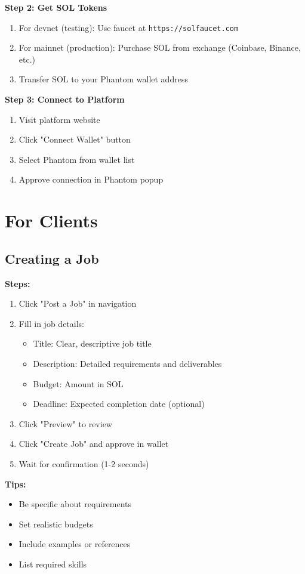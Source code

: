 \documentclass[a4paper,13pt,twoside]{report}
\theoremstyle{definition}
\begin{document}
\textbf{Step 2: Get SOL Tokens}
\begin{enumerate}
    \item For devnet (testing): Use faucet at \texttt{https://solfaucet.com}
    \item For mainnet (production): Purchase SOL from exchange (Coinbase, Binance, etc.)
    \item Transfer SOL to your Phantom wallet address
\end{enumerate}

\textbf{Step 3: Connect to Platform}
\begin{enumerate}
    \item Visit platform website
    \item Click "Connect Wallet" button
    \item Select Phantom from wallet list
    \item Approve connection in Phantom popup
\end{enumerate}

\section{For Clients}

\subsection{Creating a Job}

\textbf{Steps:}
\begin{enumerate}
    \item Click "Post a Job" in navigation
    \item Fill in job details:
    \begin{itemize}
        \item Title: Clear, descriptive job title
        \item Description: Detailed requirements and deliverables
        \item Budget: Amount in SOL
        \item Deadline: Expected completion date (optional)
    \end{itemize}
    \item Click "Preview" to review
    \item Click "Create Job" and approve in wallet
    \item Wait for confirmation (1-2 seconds)
\end{enumerate}

\textbf{Tips:}
\begin{itemize}
    \item Be specific about requirements
    \item Set realistic budgets
    \item Include examples or references
    \item List required skills
\end{itemize}
\end{document}
